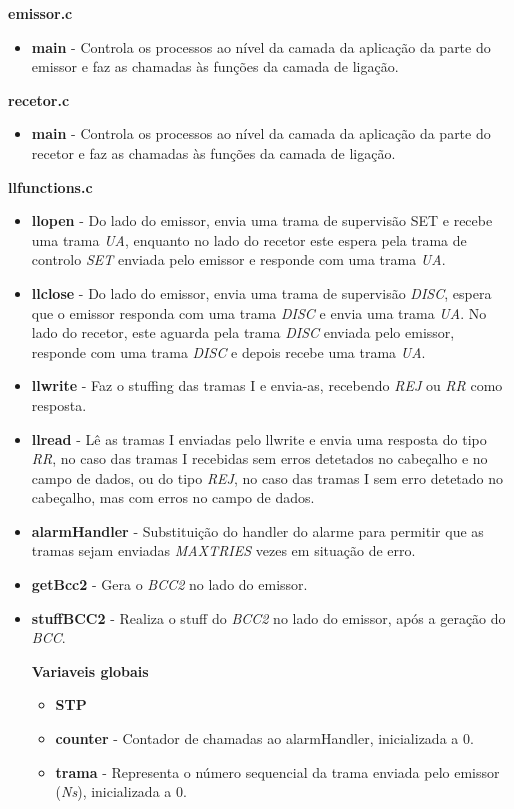 \documentclass{article}
\begin{document}
\bigskip

\textbf{emissor.c}
\begin{itemize}
	\item \textbf{main} - Controla os processos ao nível da camada da aplicação da parte do emissor e faz as chamadas às funções da camada de ligação.
\end{itemize}


\bigskip

\textbf{recetor.c}
\begin{itemize}
	\item \textbf{main} - Controla os processos ao nível da camada da aplicação da parte do recetor e faz as chamadas às funções da camada de ligação.
\end{itemize}

\bigskip

\textbf{llfunctions.c}
\begin{itemize}
	\item \textbf{llopen} - Do lado do emissor, envia uma trama de supervisão SET e recebe uma trama \textit{UA}, enquanto no lado do recetor este espera pela trama de controlo \textit{SET} enviada pelo emissor e responde com uma trama \textit{UA}.
	\item \textbf{llclose} -  Do lado do emissor, envia uma trama de supervisão \textit{DISC}, espera que o emissor responda com uma trama \textit{DISC} e envia uma trama \textit{UA}. No lado do recetor, este aguarda pela trama \textit{DISC} enviada pelo emissor, responde com uma trama \textit{DISC} e depois recebe uma trama \textit{UA}.
	\item \textbf{llwrite} - Faz o stuffing das tramas I e envia-as, recebendo \textit{REJ} ou \textit{RR} como resposta.
	\item \textbf{llread} - Lê as tramas I enviadas pelo llwrite e envia uma resposta do tipo \textit{RR}, no caso das tramas I recebidas sem erros detetados no cabeçalho e no campo de dados, ou do tipo \textit{REJ}, no caso das tramas I sem erro detetado no cabeçalho, mas com erros no campo de dados.
	\item \textbf{alarmHandler} - Substituição do handler do alarme para permitir que as tramas sejam enviadas \textit{MAXTRIES} vezes em situação de erro.
	\item \textbf{getBcc2} - Gera o \textit{BCC2} no lado do emissor.
	\item \textbf{stuffBCC2} - Realiza o stuff do \textit{BCC2} no lado do emissor, após a geração do \textit{BCC}.
	
	\textbf{Variaveis globais}
	\begin{itemize}
		\item \textbf{STP}
		\item \textbf{counter} - Contador de chamadas ao alarmHandler, inicializada a 0.
		\item \textbf{trama} - Representa o número sequencial da trama enviada pelo emissor (\textit{Ns}), inicializada a 0.
	\end{itemize}
\end{itemize}
\end{document}
